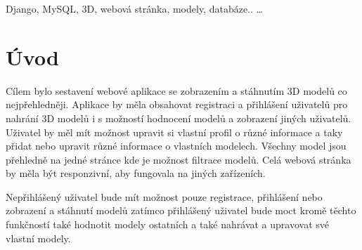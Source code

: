 \documentclass[12pt, a4paper,
twoside,        %
openright
]{report}
\begin{document}
	
	\noindent Django, MySQL, 3D, webová stránka, modely, databáze.. \dots 
	
	\vspace{18pt}
	
	\clearpage %
	\tableofcontents
	

	\setcounter{page}{4} %

	\chapter*{Úvod}
	
Cílem bylo sestavení webové aplikace se zobrazením a stáhnutím 3D modelů co nejpřehledněji. Aplikace by měla obsahovat registraci a přihlášení uživatelů  pro nahrání 3D modelů i s možností hodnocení modelů a zobrazení jiných uživatelů. Uživatel by měl mít možnost upravit si vlastní profil o různé informace a taky přidat nebo upravit různé informace o vlastních modelech. Všechny model jsou přehledně na jedné stránce kde je možnost filtrace modelů. Celá webová stránka by měla být responzivní, aby fungovala na jiných zařízeních.

Nepřihlášený uživatel bude mít možnost pouze registrace, přihlášení nebo zobrazení a stáhnutí modelů zatímco přihlášený uživatel bude moct kromě těchto funkčností také hodnotit modely ostatních a také nahrávat a upravovat své vlastní modely.
\end{document}
